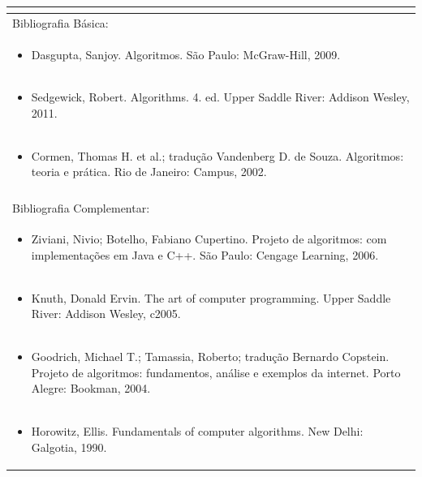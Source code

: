 \documentclass[11pt]{article}
\begin{document}
\begin{center}
\begin{longtable}{|p{4cm}|p{4cm}|p{4cm}|p{4cm}|}
\multicolumn{4}{|p{\dimexpr 16cm + 6\tabcolsep\relax}|}{}\\
\hline
\multicolumn{4}{|p{16cm}|}{Bibliografia Básica:}\\*
\multicolumn{4}{|p{\dimexpr 16cm + 6\tabcolsep\relax}|}{\begin{itemize}\item Dasgupta, Sanjoy. Algoritmos. São Paulo: McGraw-Hill, 2009.\end{itemize}}\\
\multicolumn{4}{|p{\dimexpr 16cm + 6\tabcolsep\relax}|}{\begin{itemize}\item Sedgewick, Robert. Algorithms. 4. ed. Upper Saddle River: Addison Wesley, 2011.\end{itemize}}\\
\multicolumn{4}{|p{\dimexpr 16cm + 6\tabcolsep\relax}|}{\begin{itemize}\item Cormen, Thomas H. et al.; tradução Vandenberg D. de Souza. Algoritmos: teoria e prática. Rio de Janeiro: Campus, 2002.\end{itemize}}\\
\multicolumn{4}{|p{16cm}|}{}\\
\hline
\multicolumn{4}{|p{16cm}|}{Bibliografia Complementar:}\\*
\multicolumn{4}{|p{\dimexpr 16cm + 6\tabcolsep\relax}|}{\begin{itemize}\item Ziviani, Nivio; Botelho, Fabiano Cupertino. Projeto de algoritmos: com implementações em Java e C++. São Paulo: Cengage Learning, 2006.\end{itemize}}\\
\multicolumn{4}{|p{\dimexpr 16cm + 6\tabcolsep\relax}|}{\begin{itemize}\item Knuth, Donald Ervin. The art of computer programming. Upper Saddle River: Addison Wesley, c2005.\end{itemize}}\\
\multicolumn{4}{|p{\dimexpr 16cm + 6\tabcolsep\relax}|}{\begin{itemize}\item Goodrich, Michael T.; Tamassia, Roberto; tradução Bernardo Copstein. Projeto de algoritmos: fundamentos, análise e exemplos da internet. Porto Alegre: Bookman, 2004.\end{itemize}}\\
\multicolumn{4}{|p{\dimexpr 16cm + 6\tabcolsep\relax}|}{\begin{itemize}\item Horowitz, Ellis. Fundamentals of computer algorithms. New Delhi: Galgotia, 1990.\end{itemize}}\\

\end{longtable}
\end{center}
\end{document}
